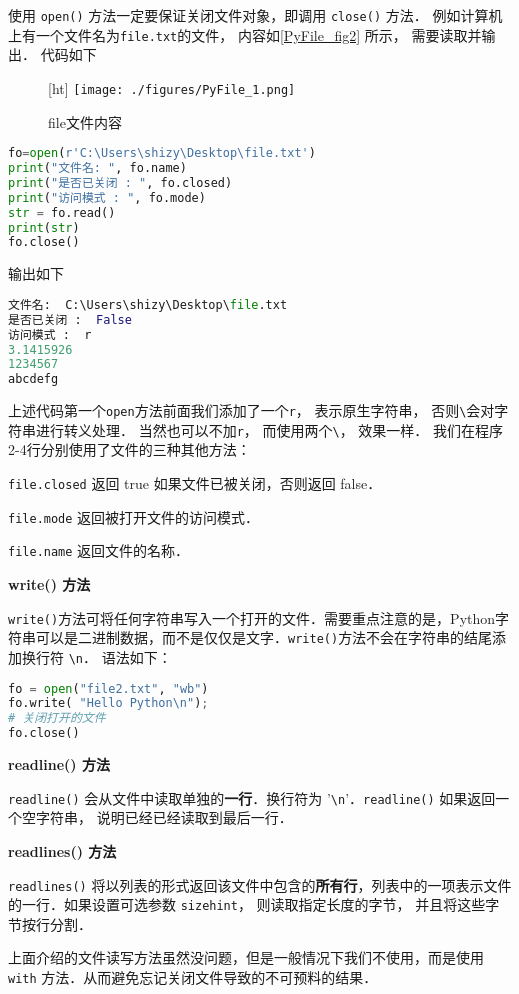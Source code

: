 使用 \verb|open()| 方法一定要保证关闭文件对象，即调用 \verb|close()| 方法． 例如计算机上有一个文件名为\verb|file.txt|的文件， 内容如\autoref{PyFile_fig2} 所示， 需要读取并输出． 代码如下
\begin{figure}\label{PyFile_fig2}[ht]
\centering
\texttt{[image: ./figures/PyFile\_1.png]}
\caption{file文件内容} \label{PyFile_fig1}
\end{figure}
\begin{lstlisting}[language=python]
fo=open(r'C:\Users\shizy\Desktop\file.txt')
print("文件名: ", fo.name)
print("是否已关闭 : ", fo.closed)
print("访问模式 : ", fo.mode)
str = fo.read()
print(str)
fo.close()
\end{lstlisting}
输出如下
\begin{lstlisting}[language=python]
文件名:  C:\Users\shizy\Desktop\file.txt
是否已关闭 :  False
访问模式 :  r
3.1415926
1234567
abcdefg
\end{lstlisting}
上述代码第一个\verb|open|方法前面我们添加了一个\verb|r|， 表示原生字符串， 否则\verb|\|会对字符串进行转义处理． 当然也可以不加\verb|r|， 而使用两个\verb|\|， 效果一样． 我们在程序2-4行分别使用了文件的三种其他方法：

\verb|file.closed| 返回 true 如果文件已被关闭，否则返回 false．

\verb|file.mode| 返回被打开文件的访问模式．

\verb|file.name| 返回文件的名称．


\textbf{write() 方法}

\verb|write()|方法可将任何字符串写入一个打开的文件．需要重点注意的是，Python字符串可以是二进制数据，而不是仅仅是文字．\verb|write()|方法不会在字符串的结尾添加换行符 \verb|\n|． 语法如下：
\begin{lstlisting}[language=python]
fo = open("file2.txt", "wb")
fo.write( "Hello Python\n");
# 关闭打开的文件
fo.close()
\end{lstlisting}

\textbf{readline() 方法}

\verb|readline()| 会从文件中读取单独的\textbf{一行}．换行符为 '\verb|\n|'．\verb|readline()| 如果返回一个空字符串， 说明已经已经读取到最后一行．

\textbf{readlines() 方法}

\verb|readlines()| 将以列表的形式返回该文件中包含的\textbf{所有行}，列表中的一项表示文件的一行．如果设置可选参数 \verb|sizehint|， 则读取指定长度的字节， 并且将这些字节按行分割．

上面介绍的文件读写方法虽然没问题，但是一般情况下我们不使用，而是使用\verb|with| 方法．从而避免忘记关闭文件导致的不可预料的结果．


